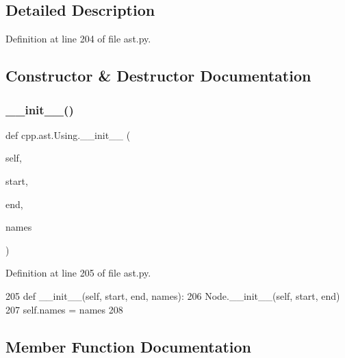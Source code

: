 \subsection{Detailed Description}


Definition at line 204 of file ast.\+py.



\subsection{Constructor \& Destructor Documentation}
\mbox{\label{classcpp_1_1ast_1_1Using_a9b7a760a06d00f7211c889d9841e06af}} 
\subsubsection{\texorpdfstring{\+\_\+\+\_\+init\+\_\+\+\_\+()}{\_\_init\_\_()}}
{\footnotesize\ttfamily def cpp.\+ast.\+Using.\+\_\+\+\_\+init\+\_\+\+\_\+ (\begin{DoxyParamCaption}\item[{}]{self,  }\item[{}]{start,  }\item[{}]{end,  }\item[{}]{names }\end{DoxyParamCaption})}



Definition at line 205 of file ast.\+py.


\begin{DoxyCode}
205     \textcolor{keyword}{def }\_\_init\_\_(self, start, end, names):
206         Node.\_\_init\_\_(self, start, end)
207         self.names = names
208 
\end{DoxyCode}


\subsection{Member Function Documentation}
\mbox{\label{classcpp_1_1ast_1_1Using_ac209e8e5d84988d14a8f4b30377e5455}} 
